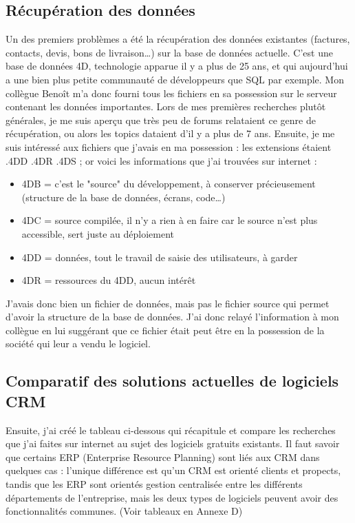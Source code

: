 \documentclass[report]{tnreport}
\begin{document}
\subsection{Récupération des données}
Un des premiers problèmes a été la récupération des données existantes (factures, contacts, devis, bons de livraison…) sur la base de données actuelle. C’est une base de données 4D, technologie apparue il y a plus de 25 ans, et qui aujourd’hui a une bien plus petite communauté de développeurs que SQL par exemple. Mon collègue Benoît m’a donc fourni tous les fichiers en sa possession sur le serveur contenant les données importantes. Lors de mes premières recherches plutôt générales, je me suis aperçu que très peu de forums relataient ce genre de récupération, ou alors les topics dataient d’il y a plus de 7 ans.
Ensuite, je me suis intéressé aux fichiers que j’avais en ma possession : les extensions étaient .4DD .4DR .4DS ; or voici les informations que j’ai trouvées sur internet :
\begin{itemize}
\item 4DB = c'est le "source" du développement, à conserver précieusement (structure de la base de données, écrans, code…)
\item 4DC = source compilée, il n'y a rien à en faire car le source n'est plus accessible, sert juste au déploiement
\item 4DD = données, tout le travail de saisie des utilisateurs, à garder 
\item 4DR = ressources du 4DD, aucun intérêt
\end{itemize}
J’avais donc bien un fichier de données, mais pas le fichier source qui permet d’avoir la structure de la base de données. J’ai donc relayé l’information à mon collègue en lui suggérant que ce fichier était peut être en la possession de la société qui leur a vendu le logiciel.


\subsection{Comparatif des solutions actuelles de logiciels CRM}

Ensuite, j’ai créé le tableau ci-dessous qui récapitule et compare les recherches que j’ai faites sur internet au sujet des logiciels gratuits existants. Il faut savoir que certains ERP (Enterprise Resource Planning) sont liés aux CRM dans quelques cas : l’unique différence est qu’un CRM est orienté clients et propects, tandis que les ERP sont orientés gestion centralisée entre les différents départements de l’entreprise, mais les deux types de logiciels peuvent avoir des fonctionnalités communes. (Voir tableaux en Annexe D)
\end{document}
